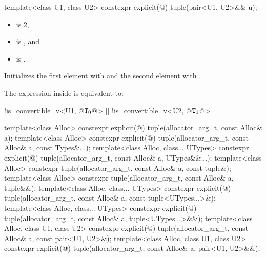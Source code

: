%
%
\begin{itemdecl}
template<class U1, class U2> constexpr explicit(@\seebelow@) tuple(pair<U1, U2>&& u);
\end{itemdecl}

\begin{itemdescr}
\pnum
\constraints
\begin{itemize}
\item {} is 2,
\item {} is , and
\item {} is .
\end{itemize}

\pnum
\effects
Initializes the first element with
 and the
second element with .

\pnum
The expression inside  is equivalent to:
\begin{codeblock}
!is_convertible_v<U1, @$\texttt{T}_0$@> || !is_convertible_v<U2, @$\texttt{T}_1$@>
\end{codeblock}
\end{itemdescr}

%
\begin{itemdecl}
template<class Alloc>
  constexpr explicit(@\seebelow@)
    tuple(allocator_arg_t, const Alloc& a);
template<class Alloc>
  constexpr explicit(@\seebelow@)
    tuple(allocator_arg_t, const Alloc& a, const Types&...);
template<class Alloc, class... UTypes>
  constexpr explicit(@\seebelow@)
    tuple(allocator_arg_t, const Alloc& a, UTypes&&...);
template<class Alloc>
  constexpr tuple(allocator_arg_t, const Alloc& a, const tuple&);
template<class Alloc>
  constexpr tuple(allocator_arg_t, const Alloc& a, tuple&&);
template<class Alloc, class... UTypes>
  constexpr explicit(@\seebelow@)
    tuple(allocator_arg_t, const Alloc& a, const tuple<UTypes...>&);
template<class Alloc, class... UTypes>
  constexpr explicit(@\seebelow@)
    tuple(allocator_arg_t, const Alloc& a, tuple<UTypes...>&&);
template<class Alloc, class U1, class U2>
  constexpr explicit(@\seebelow@)
    tuple(allocator_arg_t, const Alloc& a, const pair<U1, U2>&);
template<class Alloc, class U1, class U2>
  constexpr explicit(@\seebelow@)
    tuple(allocator_arg_t, const Alloc& a, pair<U1, U2>&&);
\end{itemdecl}

